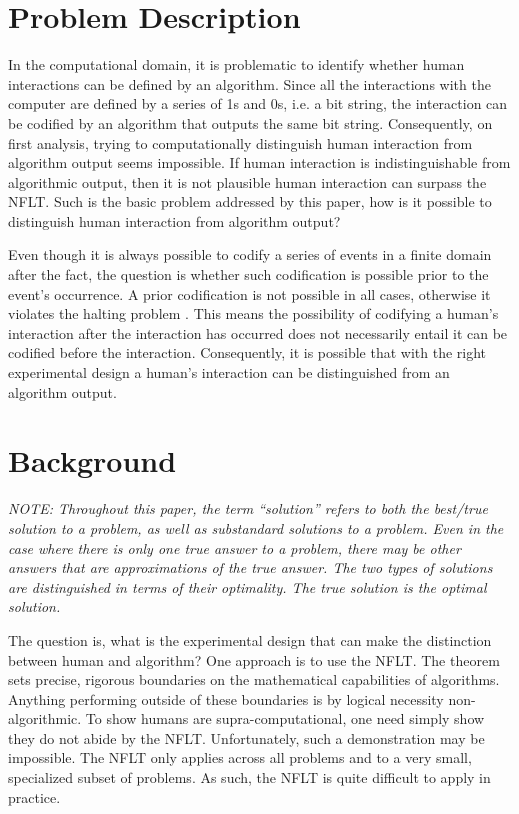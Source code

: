 \section{Problem Description}

In the computational domain, it is problematic to identify whether human interactions can be defined by an algorithm.  Since all the interactions with the computer are defined by a series of 1s and 0s, i.e. a bit string, the interaction can be codified by an algorithm that outputs the same bit string.  Consequently, on first analysis, trying to computationally distinguish human interaction from algorithm output seems impossible.  If human interaction is indistinguishable from algorithmic output, then it is not plausible human interaction can surpass the NFLT.  Such is the basic problem addressed by this paper, how is it possible to distinguish human interaction from algorithm output?

Even though it is always possible to codify a series of events in a finite domain after the fact, the question is whether such codification is possible prior to the event's occurrence.  A prior codification is not possible in all cases, otherwise it violates the halting problem \citep{cover06:_elemen_of_infor_theor}.  This means the possibility of codifying a human's interaction after the interaction has occurred does not necessarily entail it can be codified before the interaction.  Consequently, it is possible that with the right experimental design a human's interaction can be distinguished from an algorithm output.

\section{Background}\label{sec:background}

\emph{NOTE: Throughout this paper, the term ``solution'' refers to both the best/true solution to a problem, as well as substandard solutions to a problem.  Even in the case where there is only one true answer to a problem, there may be other answers that are approximations of the true answer.  The two types of solutions are distinguished in terms of their optimality.  The true solution is the optimal solution.}

The question is, what is the experimental design that can make the distinction between human and algorithm?  One approach is to use the NFLT.  The theorem sets precise, rigorous boundaries on the mathematical capabilities of algorithms. Anything performing outside of these boundaries is by logical necessity non-algorithmic.  To show humans are supra-computational, one need simply show they do not abide by the NFLT.  Unfortunately, such a demonstration may be impossible.  The NFLT only applies across all problems and to a very small, specialized subset of problems.  As such, the NFLT is quite difficult to apply in practice.

